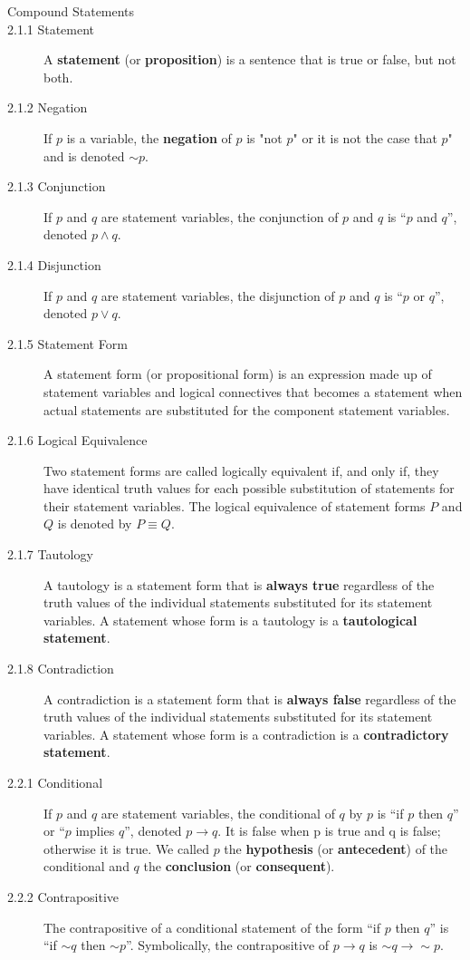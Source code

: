 \documentclass{article}
\begin{document}
\begin{description}
    \vspace{0.2cm}
    \item[\large Compound Statements]
    \item[2.1.1 Statement]A \textbf{statement} (or \textbf{proposition}) is a sentence that is true or false, but not both.
    \item[2.1.2 Negation]If $p$ is a variable, the \textbf{negation} of $p$ is "not $p$" or it is not the case that $p$" and is denoted ${\sim}p$. 
    \item[2.1.3 Conjunction]If $p$ and $q$ are statement variables, the conjunction of $p$ and $q$ is ``$p$ and $q$'', denoted $p \wedge q$.
    \item[2.1.4 Disjunction]If $p$ and $q$ are statement variables, the disjunction of $p$ and $q$ is “$p$ or $q$”, denoted $p \vee q$.
    \item[2.1.5 Statement Form]A statement form (or propositional form) is an expression made up of statement variables and logical connectives that becomes a statement when actual statements are substituted for the component statement variables.
    \item[2.1.6 Logical Equivalence]Two statement forms are called logically equivalent if, and only if, they have identical truth values for each possible substitution of statements for their statement variables. The logical equivalence of statement forms $P$ and $Q$ is denoted by $P \equiv Q$.
    \item[2.1.7 Tautology]A tautology is a statement form that is \textbf{always true} regardless of the truth values of the individual statements substituted for its statement variables. A statement whose form is a tautology is a \textbf{tautological statement}.
    \item[2.1.8 Contradiction]A contradiction is a statement form that is \textbf{always false} regardless of the truth values of the individual statements substituted for its statement variables. A statement whose form is a contradiction is a \textbf{contradictory statement}. 
    \item[2.2.1 Conditional]If $p$ and $q$ are statement variables, the conditional of $q$ by $p$ is “if $p$ then $q$” or “$p$ implies $q$”, denoted $p\to q$. It is false when p is true and q is false; otherwise it is true. We called $p$ the \textbf{hypothesis} (or \textbf{antecedent}) of the conditional and $q$ the \textbf{conclusion} (or \textbf{consequent}).
    \item[2.2.2 Contrapositive] The contrapositive of a conditional statement of the form “if $p$ then $q$” is ``if ${\sim} q$ then ${\sim} p$''. Symbolically, the contrapositive of $p\to q$ is ${\sim} q\to {\sim} p$.

\end{description}
\end{document}
